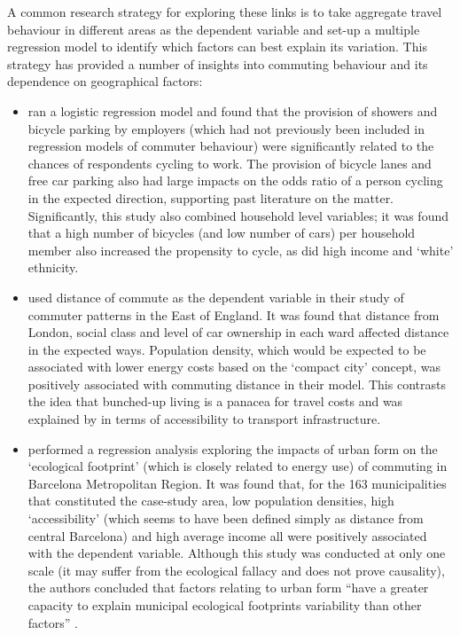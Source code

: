 \documentclass[a4paper, 11pt, twoside]{Thesis}
\begin{document}
A common research strategy for exploring these links is to take aggregate travel
behaviour in different areas as the dependent variable and set-up a
multiple regression model to identify which factors can best explain its variation.
This strategy has provided a number of insights into commuting
behaviour and its dependence on geographical factors:
\begin{itemize}
 \item \citet{Buehler2012} ran a logistic regression model and found that
 the provision of showers and bicycle parking by employers (which
 had not previously been included in regression models of commuter behaviour)
 were significantly related to the chances of respondents cycling to work.
 The provision of bicycle lanes and free car parking also had large
 impacts on the odds ratio of a person cycling in the expected
 direction, supporting past literature on the matter. Significantly, this
 study also combined household level variables; it was found that a high number
 of bicycles (and low number of cars) per household member also increased the
 propensity to cycle, as did high income and `white' ethnicity.
 \item  \citet{Titheridge2006} used distance of commute as the dependent variable
 in their study of commuter patterns in the East of England. It was found that
 distance from London, social class and level of car ownership in each ward
 affected distance in the expected ways. Population density, which would
 be expected to be associated with lower energy costs based on the `compact
 city' concept, was positively associated with commuting distance in their model.
 This contrasts the idea that bunched-up living is a panacea for travel costs and
 was explained by \citet{Titheridge2006} in terms of accessibility to transport
 infrastructure.
 \item \citet{Muniz2005} performed a regression analysis exploring the impacts of urban form on
 the `ecological footprint' (which is closely related to energy use) of commuting
 in Barcelona Metropolitan Region. It was found that, for the 163 municipalities
 that constituted the case-study area, low population densities, high `accessibility'
 (which seems to have been defined simply as distance from central Barcelona)
 and high average income all were positively associated with the dependent variable.
 Although this study was conducted at only one scale (it may suffer from the
 ecological fallacy and does not prove causality), the authors concluded that
 factors relating to urban form ``have a greater capacity to explain municipal
 ecological footprints variability than other factors'' \citep[p.~511]{Muniz2005}.
\end{itemize}
\end{document}
